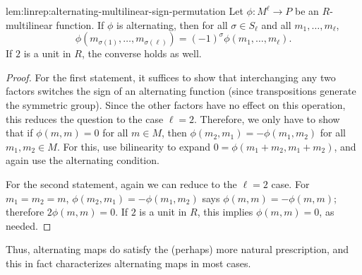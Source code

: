 \begin{lem}{}{lem:linrep:alternating-multilinear-sign-permutation}
  Let $\phi : M^\ell \to P$ be an $R$-multilinear function. If $\phi$
  is alternating, then for all $\sigma \in S_\ell$ and all
  $m_1, \dots, m_\ell$,
  \[
    \phi(m_{\sigma(1)}, \dots, m_{\sigma(\ell)}) = (-1)^\sigma
    \phi(m_1, \dots, m_\ell).
  \]
  If $2$ is a unit in $R$, the converse holds as well.
\end{lem}
\begin{proof}
  For the first statement, it suffices to show that interchanging any
  two factors switches the sign of an alternating function (since
  transpositions generate the symmetric group). Since the other
  factors have no effect on this operation, this reduces the question
  to the case $\ell = 2$. Therefore, we only have to show that if
  $\phi(m, m) = 0$ for all $m \in M$, then
  $\phi(m_2, m_1) = -\phi(m_1, m_2)$ for all $m_1, m_2 \in M$. For
  this, use bilinearity to expand $0 = \phi(m_1 + m_2, m_1 + m_2)$,
  and again use the alternating condition.

  For the second statement, again we can reduce to the $\ell = 2$
  case.  For $m_1 = m_2 = m$, $\phi(m_2, m_1) = -\phi(m_1, m_2)$ says
  $\phi(m, m) = -\phi(m, m)$; therefore $2\phi(m, m) = 0$. If $2$ is a
  unit in $R$, this implies $\phi(m, m) = 0$, as needed.
\end{proof}

Thus, alternating maps do satisfy the (perhaps) more natural
prescription, and this in fact characterizes alternating maps in most
cases.

